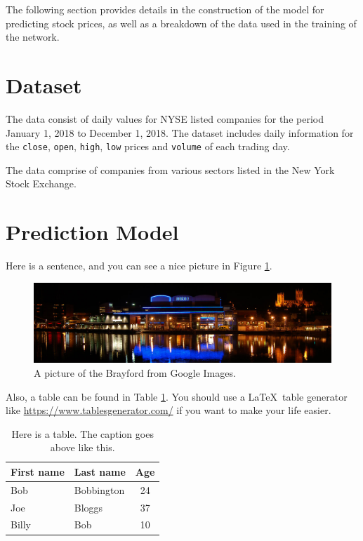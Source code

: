 The following section provides details in the construction of the model for predicting stock prices, as well as a breakdown of the data used in the training of the network.

\section{Dataset}
The data consist of daily values for NYSE listed companies for the period January 1, 2018 to December 1, 2018. The dataset includes daily information for the \texttt{close}, \texttt{open}, \texttt{high}, \texttt{low} prices and \texttt{volume} of each trading day. 


The data comprise of companies from various sectors listed in the New York Stock Exchange.

\section{Prediction Model}

Here is a sentence, and you can see a nice picture in Figure \ref{fig:brayford}.

\begin{figure}[h]
    \centering
    \includegraphics[width=\textwidth]{figures/brayford.jpg}
    \caption{A picture of the Brayford from Google Images.}
    \label{fig:brayford}
\end{figure}

Also, a table can be found in Table \ref{tbl:example-table}. You should use a \LaTeX~table generator like \url{https://www.tablesgenerator.com/} if you want to make your life easier.

\begin{table}[h]
    \caption{Here is a table. The caption goes above like this.}
    \centering
    \begin{tabular}{l|l|c}
        First name & Last name & Age \\
        \hline\hline
        Bob & Bobbington & 24 \\
        Joe & Bloggs & 37 \\
        Billy & Bob & 10 \\

    \end{tabular}
    \label{tbl:example-table}
\end{table}